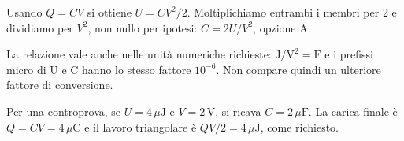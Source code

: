\documentclass[11pt,a4paper]{article}
\begin{document}
\begin{samepage}
Usando \(Q=CV\) si ottiene \(U=CV^2/2\). Moltiplichiamo entrambi i membri per 2 e dividiamo per \(V^2\), non nullo per ipotesi: \(C=2U/V^2\), opzione A.\par

La relazione vale anche nelle unità numeriche richieste: \(\mathrm{J/V^2}=\mathrm F\) e i prefissi micro di U e C hanno lo stesso fattore \(10^{-6}\). Non compare quindi un ulteriore fattore di conversione.\par

Per una controprova, se \(U=4\,\mu\mathrm J\) e \(V=2\,\mathrm V\), si ricava \(C=2\,\mu\mathrm F\). La carica finale è \(Q=CV=4\,\mu\mathrm C\) e il lavoro triangolare è \(QV/2=4\,\mu\mathrm J\), come richiesto.\par

\end{samepage}
\newpage
\end{document}
